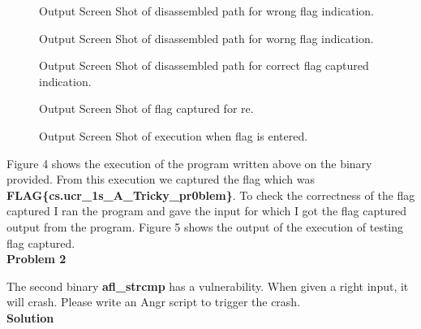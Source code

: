 \documentclass[a4paper, 12pt]{article}
\begin{document}
\begin{figure}[h]
	\centering
	\caption{Output Screen Shot of disassembled path for wrong flag indication.}
\end{figure}
\begin{figure}[h]
	\centering
	\caption{Output Screen Shot of disassembled path for worng flag indication.}
\end{figure}
\begin{figure}[h]
	\centering
	\caption{Output Screen Shot of disassembled path for correct flag captured indication.}
\end{figure}

\newpage

\begin{figure}[h]
	\centering
	\caption{Output Screen Shot of flag captured for re.}
\end{figure}

\begin{figure}[h]
	\centering
	\caption{Output Screen Shot of execution when flag is entered.}
\end{figure}

Figure 4 shows the execution of the program written above on the binary provided. From this execution we captured the flag which was \textbf{FLAG\{cs.ucr\_1s\_A\_Tricky\_pr0blem\}}. To check the correctness of the flag captured I ran the program and gave the input for which I got the flag captured output from the program. Figure 5 shows the output of the execution of testing flag captured.\\

\newpage
\noindent
\textbf{Problem 2}

The second binary \textbf{afl\_strcmp} has a vulnerability. When given a right input, it will crash. Please write an Angr script to trigger the crash.\\

\noindent
\textbf{Solution}
\end{document}
